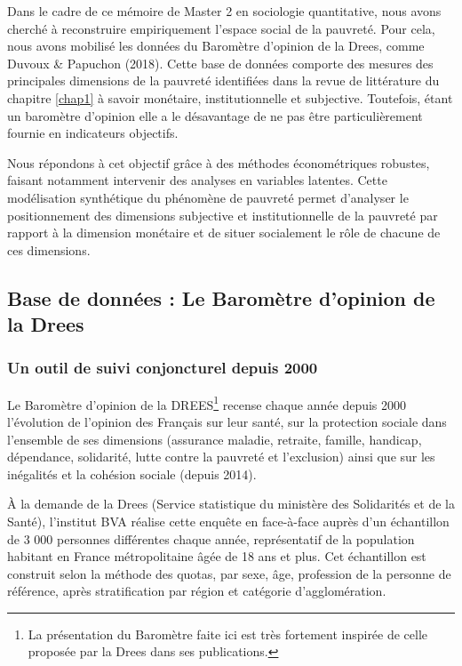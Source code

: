 \documentclass[12pt,a4paper]{reedthesis}
\begin{document}
Dans le cadre de ce mémoire de Master 2 en sociologie quantitative, nous avons cherché à reconstruire empiriquement l'espace social de la pauvreté. Pour cela, nous avons mobilisé les données du Baromètre d'opinion de la Drees, comme Duvoux \& Papuchon (2018). Cette base de données comporte des mesures des principales dimensions de la pauvreté identifiées dans la revue de littérature du chapitre \ref{chap1} à savoir monétaire, institutionnelle et subjective. Toutefois, étant un baromètre d'opinion elle a le désavantage de ne pas être particulièrement fournie en indicateurs objectifs.

Nous répondons à cet objectif grâce à des méthodes économétriques robustes, faisant notamment intervenir des analyses en variables latentes. Cette modélisation synthétique du phénomène de pauvreté permet d'analyser le positionnement des dimensions subjective et institutionnelle de la pauvreté par rapport à la dimension monétaire et de situer socialement le rôle de chacune de ces dimensions.

\hypertarget{base-de-donnuxe9es-le-baromuxe8tre-dopinion-de-la-drees}{%
\subsection{Base de données : Le Baromètre d'opinion de la Drees}\label{base-de-donnuxe9es-le-baromuxe8tre-dopinion-de-la-drees}}

\hypertarget{un-outil-de-suivi-conjoncturel-depuis-2000}{%
\subsubsection{Un outil de suivi conjoncturel depuis 2000}\label{un-outil-de-suivi-conjoncturel-depuis-2000}}

Le Baromètre d'opinion de la DREES\footnote{La présentation du Baromètre faite ici est très fortement inspirée de celle proposée par la Drees dans ses publications.} recense chaque année depuis 2000 l'évolution de l'opinion des Français sur leur santé, sur la protection sociale dans l'ensemble de ses dimensions (assurance maladie, retraite, famille, handicap, dépendance, solidarité, lutte contre la pauvreté et l'exclusion) ainsi que sur les inégalités et la cohésion sociale (depuis 2014).

À la demande de la Drees (Service statistique du ministère des Solidarités et de la Santé), l'institut BVA réalise cette enquête en face-à-face auprès d'un échantillon de 3 000 personnes différentes chaque année, représentatif de la population habitant en France métropolitaine âgée de 18 ans et plus. Cet échantillon est construit selon la méthode des quotas, par sexe, âge, profession de la personne de référence, après stratification par région et catégorie d'agglomération.
\end{document}
